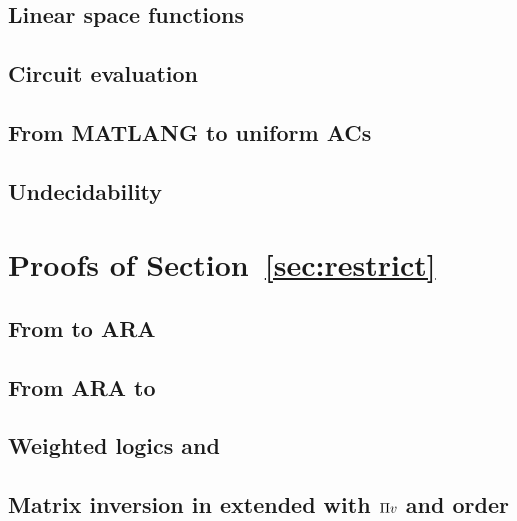 % 

\subsection{Linear space functions}


\subsection{Circuit evaluation}


\subsection{From MATLANG to uniform ACs}


\subsection{Undecidability}



\section{Proofs of Section~\ref{sec:restrict}}

\subsection{From \langsum to ARA}


\subsection{From ARA to \langsum}


% 

% 

\subsection{Weighted logics and \langprod}


\subsection{Matrix inversion in \langsum extended with $\Pi v$ and order}\label{app:asset_order}

